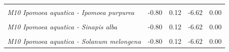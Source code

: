 \documentclass[12pt,]{article}
\begin{document}
\begin{longtable}[t]{>{}lrrrr}
\addlinespace
\em{\cellcolor{gray!6}{M10 Ipomoea aquatica - Eruca vesicaria}} & \cellcolor{gray!6}{-0.80} & \cellcolor{gray!6}{0.12} & \cellcolor{gray!6}{-6.62} & \cellcolor{gray!6}{0.00}\\
\addlinespace
\em{M10 Ipomoea aquatica - Ipomoea purpurea} & -0.80 & 0.12 & -6.62 & 0.00\\
\addlinespace
\em{\cellcolor{gray!6}{M10 Ipomoea aquatica - Petunia integrifolia}} & \cellcolor{gray!6}{-0.59} & \cellcolor{gray!6}{0.12} & \cellcolor{gray!6}{-4.89} & \cellcolor{gray!6}{0.00}\\
\addlinespace
\em{M10 Ipomoea aquatica - Sinapis alba} & -0.80 & 0.12 & -6.62 & 0.00\\
\addlinespace
\em{\cellcolor{gray!6}{M10 Ipomoea aquatica - Solanum lycopersicum}} & \cellcolor{gray!6}{-0.69} & \cellcolor{gray!6}{0.12} & \cellcolor{gray!6}{-5.70} & \cellcolor{gray!6}{0.00}\\
\addlinespace
\em{M10 Ipomoea aquatica - Solanum melongena} & -0.80 & 0.12 & -6.62 & 0.00\\
\bottomrule
\end{longtable}

\endgroup{}

\clearpage
\end{document}
